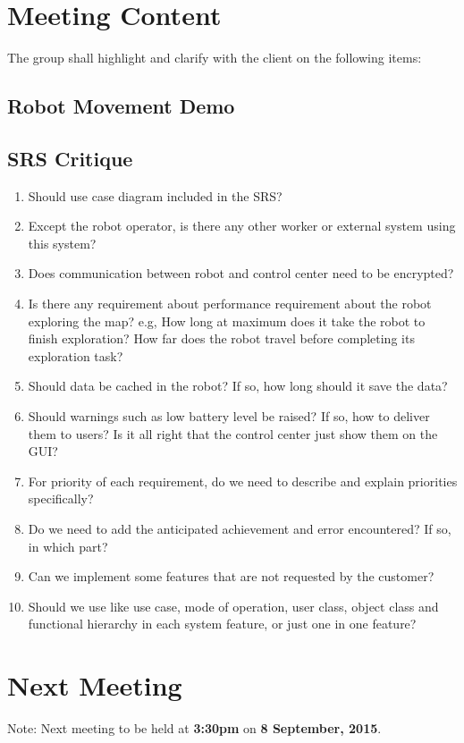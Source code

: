 \documentclass[a4paper] {article}
\begin{document}
	\section{Meeting Content}
	The group shall highlight and clarify with the client on the following items:
	
	\subsection{Robot Movement Demo}
   
	
	\subsection{SRS Critique}
	\begin{enumerate}
	        \item Should use case diagram included in the SRS?
	        \item Except the robot operator, is there any other worker or external system using this system?
	        \item Does communication between robot and control center need to be encrypted?
	        \item Is there any requirement about performance requirement about the robot exploring the map? e.g, How long at maximum does it take the robot to finish exploration? How far does the robot travel before completing its exploration task?
	        \item Should data be cached in the robot? If so, how long should it save the data? 
	        \item Should warnings such as low battery level be raised? If so, how to deliver them to users? Is it all right that the control center just show them on the GUI?
	        \item For priority of each requirement, do we need to describe and explain priorities specifically?
	        \item Do we need to add the anticipated achievement and error encountered? If so, in which part?
	        \item Can we implement some features that are not requested by the customer?
	        \item Should we use like use case, mode of operation, user class, object class and functional hierarchy in each system feature, or just one in one feature?
   \end{enumerate}
   
	\section{Next Meeting}
	Note: Next meeting to be held at \textbf{3:30pm} on \textbf {8 September, 2015}. 
	
\end{document}
